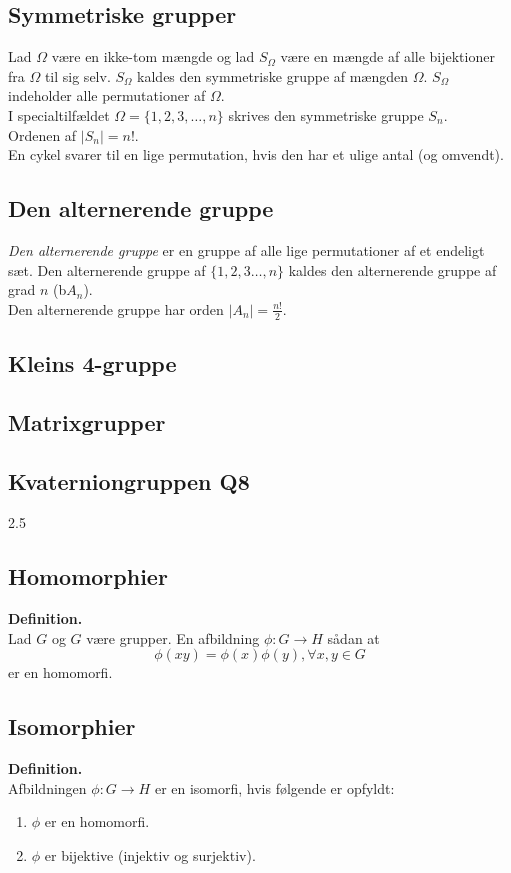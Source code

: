 \documentclass[11pt]{article}
\begin{document}
\subsection*{Symmetriske grupper}
Lad $\Omega$ være en ikke-tom mængde og lad $S_{\Omega}$ være en mængde af alle bijektioner fra $\Omega$ til sig selv. $S_{\Omega}$ kaldes den symmetriske gruppe af mængden $\Omega$. $S_{\Omega}$ indeholder alle permutationer af $\Omega$.\\
I specialtilfældet $\Omega = \{ 1,2,3, \hdots, n \}$ skrives den symmetriske gruppe $S_n$.\\
Ordenen af $|S_n| = n!$.\\
En cykel svarer til en lige permutation, hvis den har et ulige antal (og omvendt).

\subsection*{Den alternerende gruppe}
\textit{Den alternerende gruppe} er en gruppe af alle lige permutationer af et endeligt sæt. Den alternerende gruppe af $\{ 1,2,3 \hdots, n \}$ kaldes den alternerende gruppe af grad $n$ (b$A_n$).\\
Den alternerende gruppe har orden $|A_n| = \frac{n!}{2}$.
\subsection*{Kleins 4-gruppe}
\subsection*{Matrixgrupper}
\subsection*{Kvaterniongruppen Q8}
2.5
\subsection*{Homomorphier}
\textbf{Definition.}\\
Lad $G$ og $G$ være grupper. En afbildning $\phi : G \to H$ sådan at
$$\phi(xy) = \phi(x) \phi(y), \forall{x,y} \in G$$
er en homomorfi.

\subsection*{Isomorphier}
\textbf{Definition.}\\
Afbildningen $\phi : G \to H$ er en isomorfi, hvis følgende er opfyldt:
\begin{enumerate}
  \item $\phi$ er en homomorfi.
  \item $\phi$ er bijektive (injektiv og surjektiv).
\end{enumerate}
\end{document}
